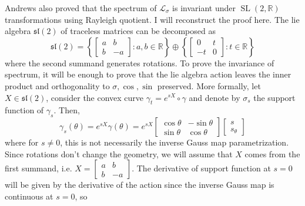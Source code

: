 \documentclass[12pt,a4paper]{article}
\newcommand{\R}{\mathbb{R}}
\begin{document}
Andrews also proved that the spectrum of $ \mathcal{L}_{\sigma} $ is invariant under $ \operatorname{SL}(2, \R) $ transformations using Rayleigh quotient. I will reconstruct the proof here. The lie algebra $ \mathfrak{sl}(2) $ of traceless matrices can be decomposed as 
\[ \mathfrak{sl}(2) = \left\{ \begin{bmatrix}
   a & b\\
   b & -a
\end{bmatrix} : a, b \in \R\right\} \oplus \left\{\begin{bmatrix}
   0 & t \\
   -t & 0
\end{bmatrix} : t \in \R \right\} \]
where the second summand generates rotations. To prove the invariance of spectrum, it will be enough to prove that the lie algebra action leaves the inner product and orthogonality to $ \sigma, \cos, \sin $ preserved. More formally, let $ X \in \mathfrak{sl}(2) $, consider the convex curve $ \gamma_{t} = e^{sX} \circ \gamma $ and denote by $ \sigma_{s} $ the support function of $ \gamma_{s} $. Then, 
\[ \gamma_{s}(\theta) = e^{sX} \gamma(\theta) = e^{sX} \begin{bmatrix}
   \cos \theta & -\sin \theta \\
   \sin \theta & \cos \theta
\end{bmatrix} \begin{bmatrix}
   s \\
   s_{\theta}
\end{bmatrix} \]
where for $ s \neq 0 $, this is not necessarily the inverse Gauss map parametrization. Since rotations don't change the geometry, we will assume that $ X $ comes from the first summand, i.e. $ X = \begin{bmatrix}
   a & b \\
   b & -a
\end{bmatrix} $. The derivative of support function at $ s=0 $ will be given by the derivative of the action since the inverse Gauss map is continuous at $ s = 0 $, so 
\end{document}
